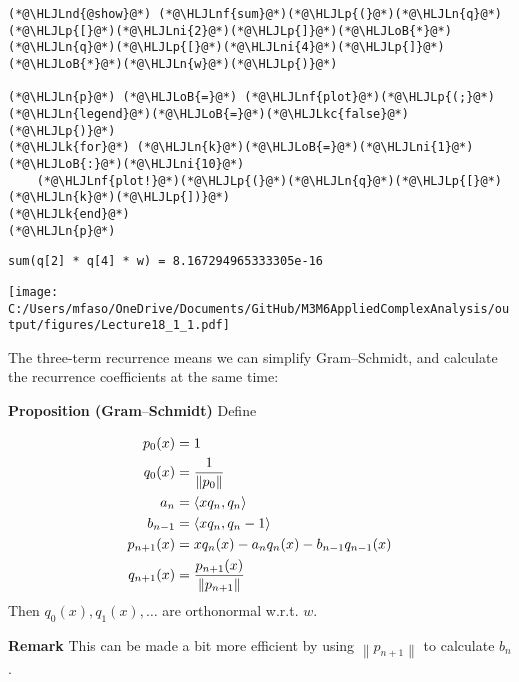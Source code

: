 \documentclass[12pt,a4paper]{article}
\newcommand{\HLJLk}[1]{\textcolor[RGB]{148,91,176}{\textbf{#1}}}
\newcommand{\HLJLkc}[1]{\textcolor[RGB]{59,151,46}{\textit{#1}}}
\newcommand{\HLJLn}[1]{#1}
\newcommand{\HLJLnd}[1]{\textcolor[RGB]{214,102,97}{#1}}
\newcommand{\HLJLnf}[1]{\textcolor[RGB]{66,102,213}{#1}}
\newcommand{\HLJLni}[1]{\textcolor[RGB]{59,151,46}{#1}}
\newcommand{\HLJLoB}[1]{\textcolor[RGB]{102,102,102}{\textbf{#1}}}
\newcommand{\HLJLp}[1]{#1}
\def\ip<#1>{\left\langle{#1}\right\rangle}
\def\norm#1{\left\| #1 \right\|}
\def\endash{–}
\begin{document}
\begin{lstlisting}
(*@\HLJLnd{@show}@*) (*@\HLJLnf{sum}@*)(*@\HLJLp{(}@*)(*@\HLJLn{q}@*)(*@\HLJLp{[}@*)(*@\HLJLni{2}@*)(*@\HLJLp{]}@*)(*@\HLJLoB{*}@*)(*@\HLJLn{q}@*)(*@\HLJLp{[}@*)(*@\HLJLni{4}@*)(*@\HLJLp{]}@*)(*@\HLJLoB{*}@*)(*@\HLJLn{w}@*)(*@\HLJLp{)}@*)

(*@\HLJLn{p}@*) (*@\HLJLoB{=}@*) (*@\HLJLnf{plot}@*)(*@\HLJLp{(;}@*) (*@\HLJLn{legend}@*)(*@\HLJLoB{=}@*)(*@\HLJLkc{false}@*)(*@\HLJLp{)}@*)
(*@\HLJLk{for}@*) (*@\HLJLn{k}@*)(*@\HLJLoB{=}@*)(*@\HLJLni{1}@*)(*@\HLJLoB{:}@*)(*@\HLJLni{10}@*)
    (*@\HLJLnf{plot!}@*)(*@\HLJLp{(}@*)(*@\HLJLn{q}@*)(*@\HLJLp{[}@*)(*@\HLJLn{k}@*)(*@\HLJLp{])}@*)
(*@\HLJLk{end}@*)
(*@\HLJLn{p}@*)
\end{lstlisting}

\begin{lstlisting}
sum(q[2] * q[4] * w) = 8.167294965333305e-16
\end{lstlisting}

\texttt{[image: C:/Users/mfaso/OneDrive/Documents/GitHub/M3M6AppliedComplexAnalysis/output/figures/Lecture18\_1\_1.pdf]}

The three-term recurrence means we can simplify Gram\ensuremath{\endash}Schmidt, and calculate the recurrence coefficients at the same time:

\textbf{Proposition (Gram\ensuremath{\endash}Schmidt)} Define


\begin{align*}
p_0(x) &= 1 \\
q_0(x) &= {1 \over \norm{p_0}}\\
a_n &= \ip<x q_n, q_n> \\
b_{n-1} &= \ip<x q_n, q_{n-1}>\\
p_{n+1}(x) &= x q_n(x) -  a_n q_n(x) -  b_{n-1} q_{n-1}(x)\\
q_{n+1}(x) &= {p_{n+1}(x) \over \norm{p_{n+1}}}
\end{align*}
Then $q_0(x), q_1(x), \ldots$ are orthonormal w.r.t. $w$.

\textbf{Remark} This can be made a bit more efficient by using $\norm{p_{n+1}}$ to calculate $b_n$.
\end{document}
